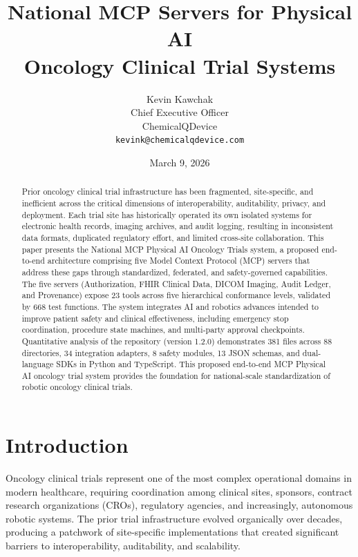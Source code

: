 \documentclass{article}
\title{National MCP Servers for Physical AI\\Oncology Clinical Trial Systems}
\author{
  Kevin Kawchak\hspace{2pt}\orcidicon{0009-0007-5457-8667} \\
  Chief Executive Officer \\
  ChemicalQDevice \\
  \texttt{kevink@chemicalqdevice.com}
}
\date{March 9, 2026}
\begin{document}
\maketitle

\begin{abstract}
Prior oncology clinical trial infrastructure has been fragmented, site-specific, and inefficient across the critical dimensions of interoperability, auditability, privacy, and deployment. Each trial site has historically operated its own isolated systems for electronic health records, imaging archives, and audit logging, resulting in inconsistent data formats, duplicated regulatory effort, and limited cross-site collaboration. This paper presents the National MCP Physical AI Oncology Trials system, a proposed end-to-end architecture comprising five Model Context Protocol (MCP) servers that address these gaps through standardized, federated, and safety-governed capabilities. The five servers (Authorization, FHIR Clinical Data, DICOM Imaging, Audit Ledger, and Provenance) expose 23 tools across five hierarchical conformance levels, validated by 668 test functions. The system integrates AI and robotics advances intended to improve patient safety and clinical effectiveness, including emergency stop coordination, procedure state machines, and multi-party approval checkpoints. Quantitative analysis of the repository (version 1.2.0) demonstrates 381 files across 88 directories, 34 integration adapters, 8 safety modules, 13 JSON schemas, and dual-language SDKs in Python and TypeScript. This proposed end-to-end MCP Physical AI oncology trial system provides the foundation for national-scale standardization of robotic oncology clinical trials.
\end{abstract}


\section{Introduction}
\label{sec:introduction}

Oncology clinical trials represent one of the most complex operational domains in modern healthcare, requiring coordination among clinical sites, sponsors, contract research organizations (CROs), regulatory agencies, and increasingly, autonomous robotic systems. The prior trial infrastructure evolved organically over decades, producing a patchwork of site-specific implementations that created significant barriers to interoperability, auditability, and scalability.
\end{document}
